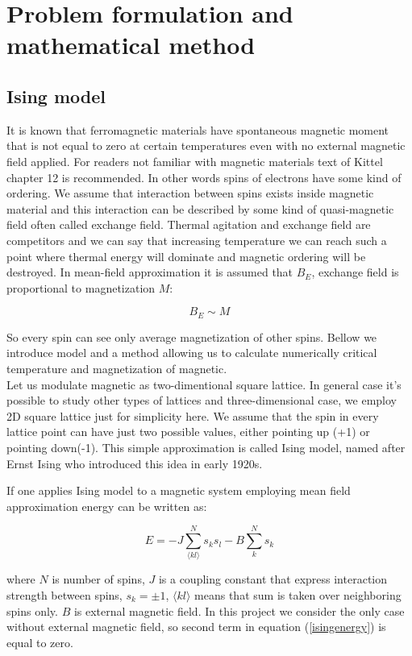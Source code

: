 \documentclass[10pt]{article}
\begin{document}
 

\newpage
\section{Problem formulation and mathematical method}\label{Part1}



\subsection{Ising model}
It is known that ferromagnetic materials have spontaneous magnetic moment that is not equal to zero at certain temperatures even with no external magnetic field applied. For readers not familiar with magnetic materials text of Kittel \cite{Kittel} chapter 12 is recommended.
In other words spins of electrons have some kind of ordering. We assume that interaction between spins exists inside magnetic material and 
this interaction can be described by some kind of quasi-magnetic field often called exchange field. Thermal agitation and exchange field are competitors and we can say that increasing temperature we can reach such a point where thermal energy will dominate and magnetic ordering will be destroyed.
In mean-field approximation it is assumed that $B_E$, exchange field is proportional to magnetization $M$:

\[
B_E \sim M
\]

So every spin can see only average magnetization of other spins. Bellow we introduce model and a method allowing us to calculate numerically critical temperature and 
magnetization of magnetic. \\
Let us modulate magnetic as two-dimentional square lattice. In general case it's possible to study other types of lattices and three-dimensional case, we employ 2D square lattice
just for simplicity here. We assume that the spin in every lattice point can have just two possible values, either pointing up (+1) or pointing down(-1). This simple approximation is
called Ising model, named after Ernst Ising who introduced this idea in early 1920s.

If one applies Ising model to a magnetic system employing mean field approximation energy can be written as:

\begin{equation}\label{isingenergy}
E=-J\sum_{\langle kl\rangle }^{N}s_{k}s_{l} - B\sum_{k}^{N}s_k
\end{equation}

where $N$ is number of spins, $J$ is a coupling constant that express interaction
strength between spins, $s_{k}=\pm 1$, $\langle kl\rangle $
means that sum is taken over neighboring spins only. $B$ is external magnetic field.
In this project we consider the only case without external magnetic field, so second term in equation (\ref{isingenergy}) is equal to zero.\\
\end{document}
